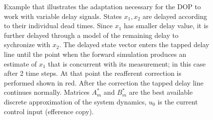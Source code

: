 \begin{figure}[h!]
    \centering

    \caption{Example that illustrates the adaptation necessary for the DOP to work with variable delay signals. States \ensuremath{x_1, x_2} are delayed according to their individual dead times. Since \ensuremath{x_1} has smaller delay value, it is further delayed through a model of the remaining delay to sychronize with \ensuremath{x_2}. The delayed state vector enters the tapped delay line until the point when the forward simulation produces an estimate of \ensuremath{x_1} that is concurrent with its measurement; in this case after 2 time steps. At that point the reafferent correction is performed shown  in red. After the correction the tapped delay line continues normally. Matrices \ensuremath{A^*_m} and \ensuremath{B^*_m} are the best available discrete approximation of the system dynamics, \ensuremath{u_0} is the current control input (efference copy).}
    \label{fig:VDROP_line}
\end{figure}
